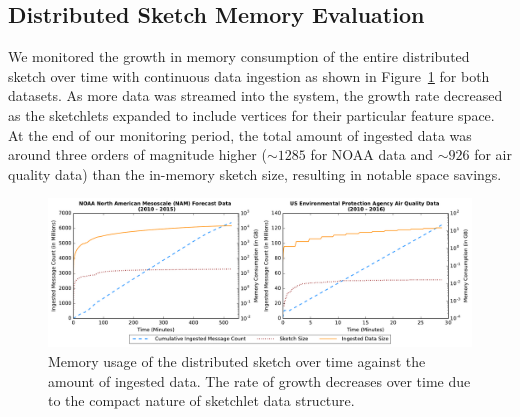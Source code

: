 \documentclass[9pt,journal,compsoc]{IEEEtran}
\begin{document}
\subsection{Distributed Sketch Memory Evaluation}
We monitored the growth in memory consumption of the entire distributed sketch over time with continuous data ingestion as shown in Figure~\ref{fig:dist-sketch-mem-usage} for both datasets. As more data was streamed into the system, the growth rate decreased as the sketchlets expanded to include vertices for their particular feature space.  At the end of our monitoring period, the total amount of ingested data was around three orders of magnitude higher ($\sim 1285$ for NOAA data and $\sim 926$ for air quality data) than the in-memory sketch size, resulting in notable space savings.
%
%
\begin{figure}[t!]
    \centerline{\includegraphics[width=\linewidth]{figures/ing-and-mem-usage-noaa-airquality.pdf}}
    \caption{Memory usage of the distributed sketch over time against the amount of ingested data. The rate of growth decreases over time due to the compact nature of sketchlet data structure.}
    \label{fig:dist-sketch-mem-usage}
\end{figure}
%
\end{document}

